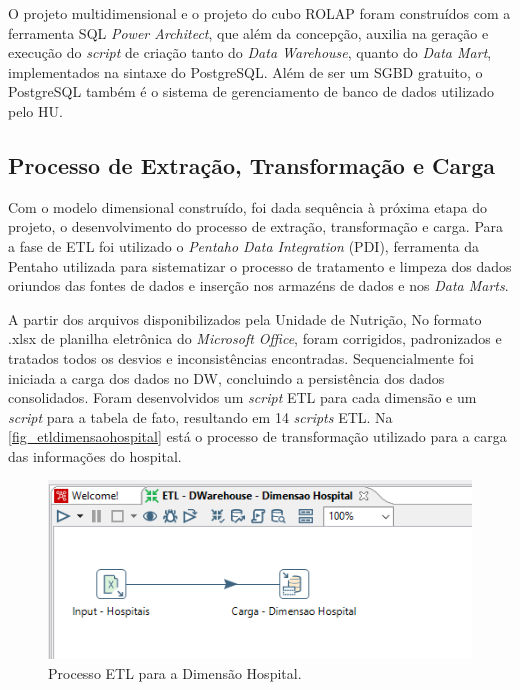 O projeto multidimensional e o projeto do cubo ROLAP foram construídos com a ferramenta SQL \textit{Power Architect}, que além da concepção, auxilia na geração e execução do \textit{script} de criação tanto do \textit{Data Warehouse}, quanto do \textit{Data Mart}, implementados na sintaxe do PostgreSQL. Além de ser um SGBD gratuito, o PostgreSQL também é o sistema de gerenciamento de banco de dados utilizado pelo HU. 

\subsection{Processo de Extração, Transformação e Carga}
Com o modelo dimensional construído, foi dada sequência à próxima etapa do projeto, o desenvolvimento do processo de extração, transformação e carga. Para a fase de ETL foi utilizado o \textit{Pentaho Data Integration} (PDI), ferramenta da Pentaho utilizada para sistematizar o processo de tratamento e limpeza dos dados oriundos das fontes de dados e inserção nos armazéns de dados e nos \textit{Data Marts}.

A partir dos arquivos disponibilizados pela Unidade de Nutrição, No formato .xlsx de planilha eletrônica do \textit{Microsoft Office}, foram corrigidos, padronizados e tratados todos os desvios e inconsistências encontradas. Sequencialmente foi iniciada a carga dos dados no DW, concluindo a persistência dos dados consolidados. Foram desenvolvidos um \textit{script} ETL para cada dimensão e um \textit{script} para a tabela de fato, resultando em 14 \textit{scripts} ETL. Na \autoref{fig_etldimensaohospital} está o processo de transformação utilizado para a carga das informações do hospital. 

\begin{figure}[htb]
	\caption{\label{fig_etldimensaohospital}Processo ETL para a Dimensão Hospital.}
	\begin{center}
	    \includegraphics[scale=0.7]{Imagens/figura - etl dw hospital.png}
	\end{center}
\end{figure}

